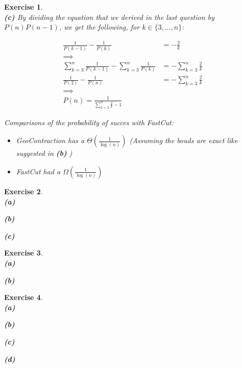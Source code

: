 \documentclass{article}
\newtheorem{exo}{Exercise}
\begin{document}
\begin{exo}{\ \\}
\noindent
\textbf{(c)} By dividing the equation that we derived in the last question by $P(n)P(n-1)$, we get the following, for $k \in \{3, \dots, n\}$:

\begin{align*}
    \frac{1}{P(k-1)} - \frac{1}{P(k)}  &= - \frac{2}{k}  \\
    \implies & \\
    \sum_{k=3}^{n} \frac{1}{P(k-1)} - \sum_{k=3}^{n} \frac{1}{P(k)}  &=
    - \sum_{k=3}^{n} \frac{2}{k}  \\
    \frac{1}{P(2)} - \frac{1}{P(n)}  &= -\sum_{k=3}^{n} \frac{2}{k}  \\
    \implies &\\
    P(n) = \frac{1}{\sum_{k=3}^{n} \frac{2}{k} -1} 
\end{align*}

Comparisons of the probability of succes with FastCut:

\begin{itemize} 
    \item GeoContraction has a $\Theta(\frac{1}{\log(n)})$ (Assuming the bouds are exact like suggested in \textbf{(b)} )
    \item FastCut had a $\Omega(\frac{1}{\log(n)})$ 
\end{itemize}


\end{exo}

\begin{exo}{\ \\}
\noindent
\textbf{(a)}

\noindent
\textbf{(b)} 

\noindent
\textbf{(c)}  
\end{exo}

\begin{exo}{\ \\}
\noindent
\textbf{(a)}

\noindent
\textbf{(b)} 

\end{exo}


\begin{exo}{\ \\}
\noindent
\textbf{(a)}

\noindent
\textbf{(b)} 

\noindent
\textbf{(c)}  

\noindent
\textbf{(d)} 
\end{exo}
\end{document}
